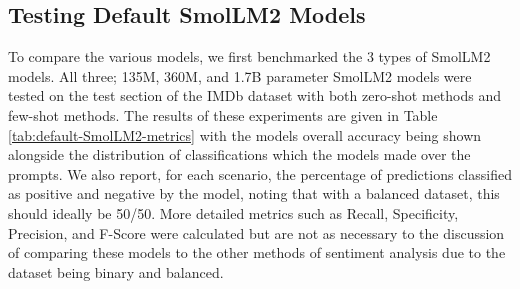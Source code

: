 \documentclass[10pt,twocolumn,letterpaper]{article}
\begin{document}
\subsection{Testing Default SmolLM2 Models}

To compare the various models, we first benchmarked the 3 types of SmolLM2 models. All three; 135M, 360M, and 1.7B parameter  SmolLM2 models were tested on the test section of the IMDb dataset \cite{IMDB-dataset} with both zero-shot methods and few-shot methods. The results of these experiments are given in Table \ref{tab:default-SmolLM2-metrics} with the models overall accuracy being shown alongside the distribution of classifications which the models made over the prompts.  We also report, for each scenario, the percentage of predictions classified as positive and negative by the model, noting that with a balanced dataset, this should ideally be 50/50. More detailed metrics such as Recall, Specificity, Precision, and F-Score were calculated but are not as necessary to the discussion of comparing these models to the other methods of sentiment analysis due to the dataset being binary and balanced.






\end{document}
